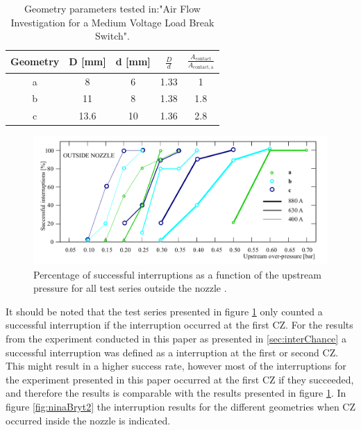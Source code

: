 \documentclass[10pt,a4paper]{article}
\begin{document}
\begin{table}[H]
\center
\caption{Geometry parameters tested in:"Air Flow Investigation for a Medium Voltage Load Break Switch".}
 \begin{tabular}{|c|c|c|c|c|}
\hline 
Geometry & D [mm] & d [mm] & $\frac{D}{d}$ & $\frac{A_\mathrm{{contact}}}{A_\mathrm{{contact,a}}}$ \\ 
\hline 
a & 8 & 6 & 1.33 & 1 \\ 
\hline 
b & 11 & 8 & 1.38 & 1.8 \\ 
\hline 
c & 13.6 & 10 & 1.36 & 2.8 \\ 
\hline 
\end{tabular} 
\label{tab:NinasGeo}
\end{table}

\begin{figure}[H]
  \centering
  \includegraphics[scale=0.4]{Bilder/Discussion/ninaResults.png}
  \caption{Percentage of successful interruptions as a function of the upstream pressure for all test series outside the nozzle \cite{bib:AFIMVLBA}.}
  \label{fig:ninaBryt}
\end{figure}

It should be noted that the test series presented in figure \ref{fig:ninaBryt} only counted a successful interruption if the interruption occurred at the first CZ. For the results from the experiment conducted in this paper as presented in \ref{sec:interChance} a successful interruption was defined as a interruption at the first or second CZ. This might result in a higher success rate, however most of the interruptions for the experiment presented in this paper occurred at the first CZ if they succeeded, and therefore the results is comparable with the results presented in figure \ref{fig:ninaBryt}. In figure \ref{fig:ninaBryt2} the interruption results for the different geometries when CZ occurred inside the nozzle is indicated.
\end{document}
